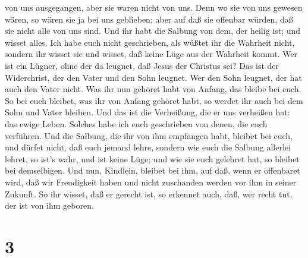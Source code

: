 von uns ausgegangen, aber sie waren nicht von uns. Denn wo sie von uns
gewesen wären, so wären sie ja bei uns geblieben; aber auf daß sie
offenbar würden, daß sie nicht alle von uns sind.  Und ihr
habt die Salbung von dem, der heilig ist; und wisset alles.
 Ich habe euch nicht geschrieben, als wüßtet ihr die
Wahrheit nicht, sondern ihr wisset sie und wisset, daß keine Lüge aus
der Wahrheit kommt.  Wer ist ein Lügner, ohne der da
leugnet, daß Jesus der Christus sei? Das ist der Widerchrist, der den
Vater und den Sohn leugnet.  Wer den Sohn leugnet, der hat
auch den Vater nicht.  Was ihr nun gehöret habt von Anfang,
das bleibe bei euch. So bei euch bleibet, was ihr von Anfang gehöret
habt, so werdet ihr auch bei dem Sohn und Vater bleiben. 
Und das ist die Verheißung, die er uns verheißen hat: das ewige Leben.
 Solches habe ich euch geschrieben von denen, die euch
verführen.  Und die Salbung, die ihr von ihm empfangen
habt, bleibet bei euch, und dürfet nicht, daß euch jemand lehre, sondern
wie euch die Salbung allerlei lehret, so ist's wahr, und ist keine Lüge;
und wie sie euch gelehret hat, so bleibet bei demselbigen. 
Und nun, Kindlein, bleibet bei ihm, auf daß, wenn er offenbaret wird,
daß wir Freudigkeit haben und nicht zuschanden werden vor ihm in seiner
Zukunft.  So ihr wisset, daß er gerecht ist, so erkennet
auch, daß, wer recht tut, der ist von ihm geboren.

\hypertarget{section-2}{%
\section{3}\label{section-2}}

